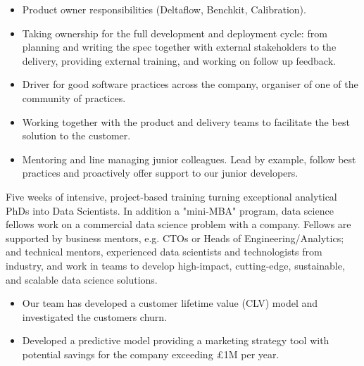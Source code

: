\documentclass[10pt,a4paper,ragged2e,withhyper]{altacv}
\begin{document}
\begin{paracol}{2}



\begin{itemize}
    \item Product owner responsibilities (Deltaflow, Benchkit, Calibration).
    \item Taking ownership for the full development and deployment cycle: from planning
    and writing the spec together with external stakeholders to the delivery,
    providing external training, and working on follow up feedback.
    \item Driver for good software practices across the company, organiser of one of
    the community of practices.
    \item Working together with the product and delivery teams to facilitate the
    best solution to the customer.
    \item Mentoring and line managing junior colleagues. Lead by example, follow best
    practices and proactively offer support to our junior developers.
\end{itemize}

\divider


Five weeks of intensive, project-based training turning exceptional analytical PhDs into Data Scientists.
In addition a "mini-MBA" program, data science fellows work on a commercial data science problem with a company.
Fellows are supported by business mentors, e.g. CTOs or Heads of Engineering/Analytics;
and technical mentors, experienced data scientists and technologists from industry,
and work in teams to develop high-impact, cutting-edge, sustainable, and scalable data science solutions.

\begin{itemize}

    \item Our team has developed a customer lifetime value (CLV) model and investigated the customers churn.

    \item Developed a predictive model providing a marketing strategy tool with potential savings
    for the company exceeding £1M per year.


\end{itemize}
\end{paracol}
\end{document}

